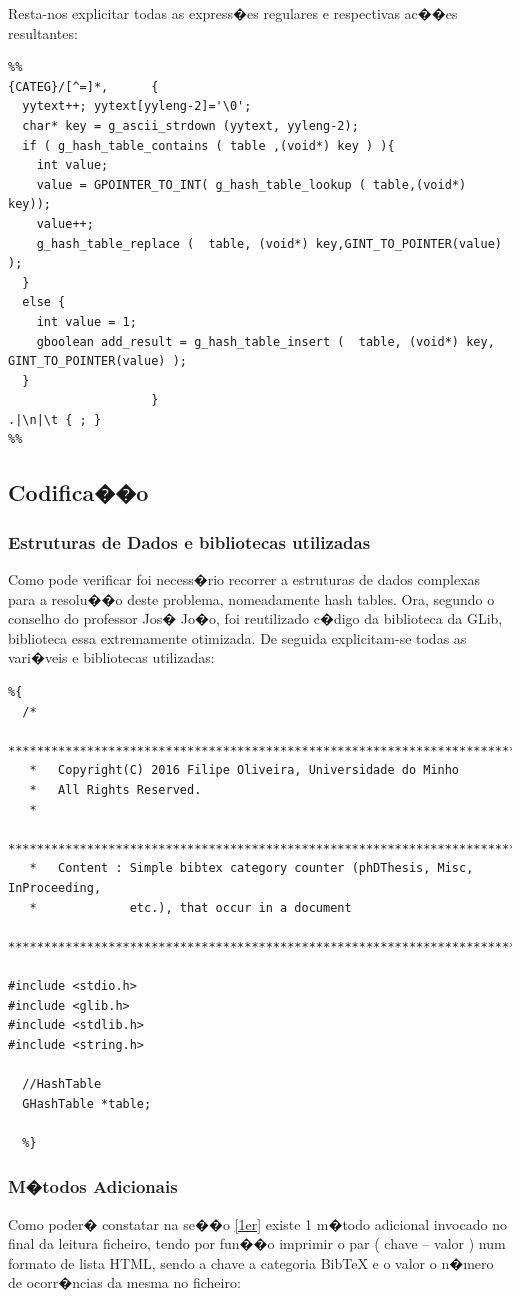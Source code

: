 \documentclass{report}
\begin{document}
Resta-nos explicitar todas as express�es regulares e respectivas ac��es resultantes:

\begin{lstlisting}
%%
{CATEG}/[^=]*,      {
  yytext++; yytext[yyleng-2]='\0';
  char* key = g_ascii_strdown (yytext, yyleng-2);
  if ( g_hash_table_contains ( table ,(void*) key ) ){
    int value;
    value = GPOINTER_TO_INT( g_hash_table_lookup ( table,(void*) key));
    value++;
    g_hash_table_replace (  table, (void*) key,GINT_TO_POINTER(value) );
  }
  else {
    int value = 1;
    gboolean add_result = g_hash_table_insert (  table, (void*) key,  GINT_TO_POINTER(value) );
  }
                    }
.|\n|\t { ; }
%%
\end{lstlisting}


\subsection{Codifica��o }
\subsubsection{Estruturas de Dados e bibliotecas utilizadas}
Como pode verificar foi necess�rio recorrer a  estruturas de dados complexas para a resolu��o deste problema, nomeadamente hash tables. Ora, segundo o conselho do professor Jos� Jo�o, foi reutilizado c�digo da biblioteca da GLib, biblioteca essa extremamente otimizada.
De seguida explicitam-se todas as vari�veis e bibliotecas utilizadas:
\begin{lstlisting}
%{
  /*
   ********************************************************************************
   *   Copyright(C) 2016 Filipe Oliveira, Universidade do Minho
   *   All Rights Reserved.
   *
   ********************************************************************************
   *   Content : Simple bibtex category counter (phDThesis, Misc, InProceeding,
   *             etc.), that occur in a document
   ********************************************************************************/

#include <stdio.h>
#include <glib.h>
#include <stdlib.h>
#include <string.h>

  //HashTable
  GHashTable *table; 

  %}
  \end{lstlisting}

  \subsubsection{M�todos Adicionais}
  Como poder� constatar na se��o \ref{1er} existe 1 m�todo adicional invocado no final da leitura ficheiro, tendo por fun��o imprimir o par ( chave -- valor ) num formato de lista HTML, sendo a chave a categoria BibTeX e o valor o n�mero de ocorr�ncias da mesma no ficheiro:
\end{document}
